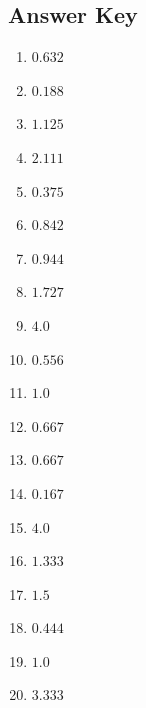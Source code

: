 \documentclass{article}
\begin{document}
\newpage

\subsection*{Answer Key}

\begin{enumerate}
\item $\displaystyle 0.632 $ \ 
\item $\displaystyle 0.188 $ \ 
\item $\displaystyle 1.125 $ \ 
\item $\displaystyle 2.111 $ \ 
\item $\displaystyle 0.375 $ \ 
\item $\displaystyle 0.842 $ \ 
\item $\displaystyle 0.944 $ \ 
\item $\displaystyle 1.727 $ \ 
\item $\displaystyle 4.0 $ \ 
\item $\displaystyle 0.556 $ \ 
\item $\displaystyle 1.0 $ \ 
\item $\displaystyle 0.667 $ \ 
\item $\displaystyle 0.667 $ \ 
\item $\displaystyle 0.167 $ \ 
\item $\displaystyle 4.0 $ \ 
\item $\displaystyle 1.333 $ \ 
\item $\displaystyle 1.5 $ \ 
\item $\displaystyle 0.444 $ \ 
\item $\displaystyle 1.0 $ \ 
\item $\displaystyle 3.333 $ \ 

\end{enumerate}
\end{document}
